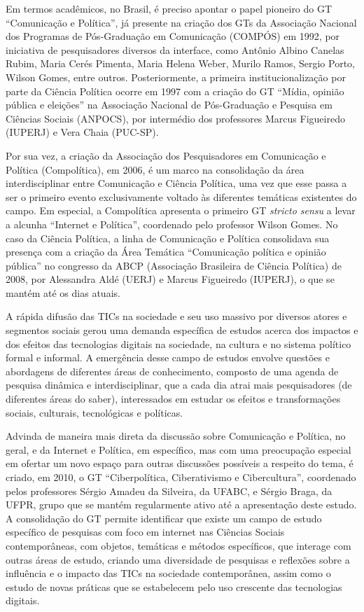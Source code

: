Em termos acadêmicos, no Brasil, é preciso apontar o papel pioneiro do
GT ``Comunicação e Política'', já presente na criação dos GTs da
Associação Nacional dos Programas de Pós-Graduação em Comunicação
(COMPÓS) em 1992, por iniciativa de pesquisadores diversos da interface,
como Antônio Albino Canelas Rubim, Maria Cerés Pimenta, Maria Helena
Weber, Murilo Ramos, Sergio Porto, Wilson Gomes, entre outros.
Posteriormente, a primeira institucionalização por parte da Ciência
Política ocorre em 1997 com a criação do GT ``Mídia, opinião pública e
eleições'' na Associação Nacional de Pós-Graduação e Pesquisa em
Ciências Sociais (ANPOCS), por intermédio dos professores Marcus
Figueiredo (IUPERJ) e Vera Chaia (PUC-SP).

Por sua vez, a criação da Associação dos Pesquisadores em Comunicação e
Política (Compolítica), em 2006, é um marco na consolidação da área
interdisciplinar entre Comunicação e Ciência Política, uma vez que esse
passa a ser o primeiro evento exclusivamente voltado às diferentes
temáticas existentes do campo. Em especial, a Compolítica apresenta o
primeiro GT \emph{stricto sensu} a levar a alcunha ``Internet e
Política'', coordenado pelo professor Wilson Gomes. No caso da Ciência
Política, a linha de Comunicação e Política consolidava sua presença com
a criação da Área Temática ``Comunicação política e opinião pública'' no
congresso da ABCP (Associação Brasileira de Ciência Política) de 2008,
por Alessandra Aldé (UERJ) e Marcus Figueiredo (IUPERJ), o que se mantém
até os dias atuais.

A rápida difusão das TICs na sociedade e seu uso massivo por diversos
atores e segmentos sociais gerou uma demanda específica de estudos
acerca dos impactos e dos efeitos das tecnologias digitais na sociedade,
na cultura e no sistema político formal e informal. A emergência desse
campo de estudos envolve questões e abordagens de diferentes áreas de
conhecimento, composto de uma agenda de pesquisa dinâmica e
interdisciplinar, que a cada dia atrai mais pesquisadores (de diferentes
áreas do saber), interessados em estudar os efeitos e transformações
sociais, culturais, tecnológicas e políticas.

Advinda de maneira mais direta da discussão sobre Comunicação e
Política, no geral, e da Internet e Política, em específico, mas com uma
preocupação especial em ofertar um novo espaço para outras discussões
possíveis a respeito do tema, é criado, em 2010, o GT ``Ciberpolítica,
Ciberativismo e Cibercultura'', coordenado pelos professores Sérgio
Amadeu da Silveira, da UFABC, e Sérgio Braga, da UFPR, grupo que se
mantém regularmente ativo até a apresentação deste estudo. A
consolidação do GT permite identificar que existe um campo de estudo
específico de pesquisas com foco em internet nas Ciências Sociais
contemporâneas, com objetos, temáticas e métodos específicos, que
interage com outras áreas de estudo, criando uma diversidade de
pesquisas e reflexões sobre a influência e o impacto das TICs na
sociedade contemporânea, assim como o estudo de novas práticas que se
estabelecem pelo uso crescente das tecnologias digitais.

